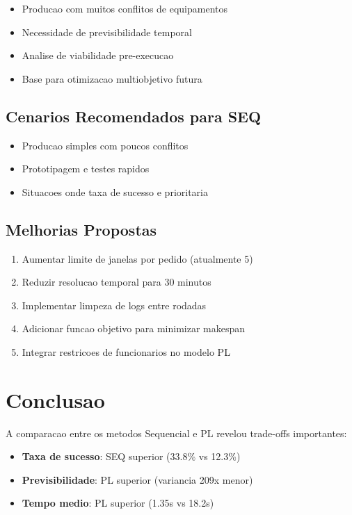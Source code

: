 \documentclass[12pt,a4paper]{article}
\begin{document}
\begin{itemize}
    \item Producao com muitos conflitos de equipamentos
    \item Necessidade de previsibilidade temporal
    \item Analise de viabilidade pre-execucao
    \item Base para otimizacao multiobjetivo futura
\end{itemize}

\subsection{Cenarios Recomendados para SEQ}

\begin{itemize}
    \item Producao simples com poucos conflitos
    \item Prototipagem e testes rapidos
    \item Situacoes onde taxa de sucesso e prioritaria
\end{itemize}

\subsection{Melhorias Propostas}

\begin{enumerate}
    \item Aumentar limite de janelas por pedido (atualmente 5)
    \item Reduzir resolucao temporal para 30 minutos
    \item Implementar limpeza de logs entre rodadas
    \item Adicionar funcao objetivo para minimizar makespan
    \item Integrar restricoes de funcionarios no modelo PL
\end{enumerate}

\section{Conclusao}

A comparacao entre os metodos Sequencial e PL revelou trade-offs importantes:

\begin{itemize}
    \item \textbf{Taxa de sucesso}: SEQ superior (33.8\% vs 12.3\%)
    \item \textbf{Previsibilidade}: PL superior (variancia 209x menor)
    \item \textbf{Tempo medio}: PL superior (1.35s vs 18.2s)
\end{itemize}
\end{document}
